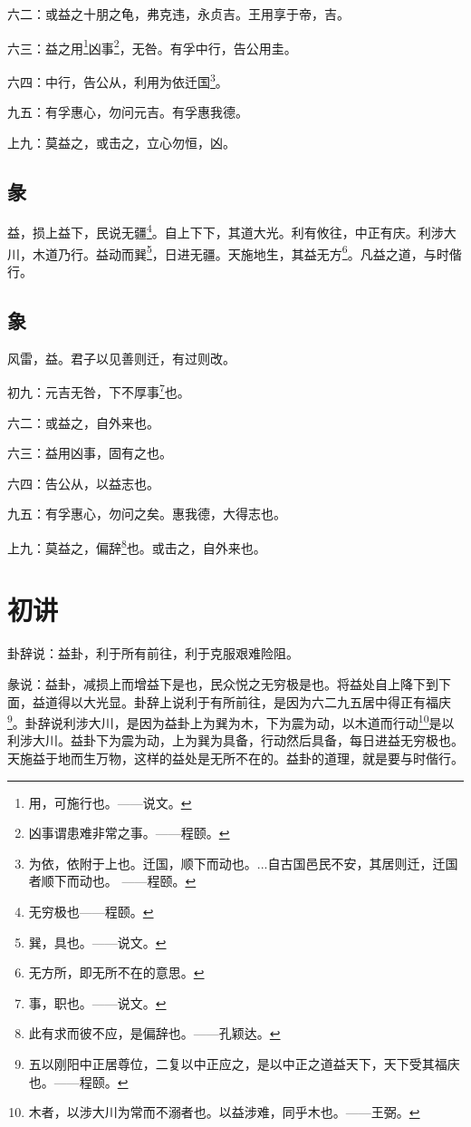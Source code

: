 \documentclass[12pt,oneside]{book}
\begin{document}
六二：或益之十朋之龟，弗克违，永贞吉。王用享于帝，吉。

六三：益之用\footnote{用，可施行也。——说文。}凶事\footnote{凶事谓患难非常之事。——程颐。}，无咎。有孚中行，告公用圭。

六四：中行，告公从，利用为依迁国\footnote{为依，依附于上也。迁国，顺下而动也。...自古国邑民不安，其居则迁，迁国者顺下而动也。 ——程颐。}。

九五：有孚惠心，勿问元吉。有孚惠我德。

上九：莫益之，或击之，立心勿恒，凶。

\subsection{彖}
益，损上益下，民说无疆\footnote{无穷极也——程颐。}。自上下下，其道大光。利有攸往，中正有庆。利涉大川，木道乃行。益动而巽\footnote{巽，具也。——说文。}，日进无疆。天施地生，其益无方\footnote{无方所，即无所不在的意思。}。凡益之道，与时偕行。

\subsection{象}
风雷，益。君子以见善则迁，有过则改。

初九：元吉无咎，下不厚事\footnote{事，职也。——说文。}也。

六二：或益之，自外来也。

六三：益用凶事，固有之也。

六四：告公从，以益志也。

九五：有孚惠心，勿问之矣。惠我德，大得志也。

上九：莫益之，偏辞\footnote{此有求而彼不应，是偏辞也。——孔颖达。}也。或击之，自外来也。

\section{初讲}
卦辞说：益卦，利于所有前往，利于克服艰难险阻。

彖说：益卦，减损上而增益下是也，民众悦之无穷极是也。将益处自上降下到下面，益道得以大光显。卦辞上说利于有所前往，是因为六二九五居中得正有福庆\footnote{五以刚阳中正居尊位，二复以中正应之，是以中正之道益天下，天下受其福庆也。——程颐。}。卦辞说利涉大川，是因为益卦上为巽为木，下为震为动，以木道而行动\footnote{木者，以涉大川为常而不溺者也。以益涉难，同乎木也。——王弼。}是以利涉大川。益卦下为震为动，上为巽为具备，行动然后具备，每日进益无穷极也。天施益于地而生万物，这样的益处是无所不在的。益卦的道理，就是要与时偕行。
\end{document}
